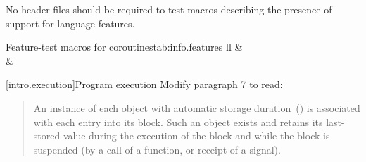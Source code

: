 \pnum
No header files should be required to test macros describing the presence
of support for language features.

\begin{floattable}{Feature-test macros for coroutines}{tab:info.features}
{ll}
\topline
{} &  \\
\capsep
{}  &       \\
\end{floattable}

%

\setcounter{section}{8}
[intro.execution]{Program execution}
Modify paragraph 7 to read:
\begin{quote}
\setcounter{Paras}{6}
\pnum 
An instance of each object with automatic storage 
duration~() is associated with each entry into its 
block. Such an object exists and retains its last-stored value during 
the execution of the block and while the block is suspended (by a call 
of a function, 
or receipt of a signal). 
\end{quote}
